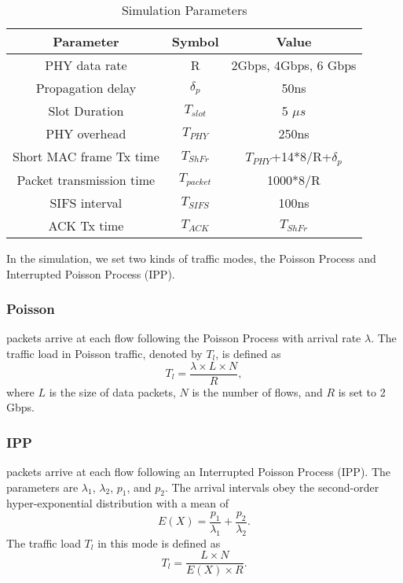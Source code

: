 \documentclass[journal]{IEEEtran}
\begin{document}
\begin{table}
\begin{center}
\caption{Simulation Parameters}
\def \temptablewidth {0.9\textwidth}
\begin{tabular}{ccc}
\hline
\textbf{Parameter}&\textbf{Symbol}&\textbf{Value}\\
\hline
PHY data rate & R & 2Gbps, 4Gbps, 6 Gbps \\
Propagation delay&${\delta _p}$& 50ns\\
Slot Duration & $T_{slot}$ & 5 $\mu s$\\
PHY overhead& ${T_{PHY}}$ & 250ns\\
Short MAC frame Tx time& ${T_{ShFr}}$& ${T_{PHY}}$+14*8/R+${\delta _p}$\\
Packet transmission time&${T_{packet}}$& 1000*8/R\\
SIFS interval&${T_{SIFS}}$& 100ns\\
ACK Tx time&${T_{ACK}}$&${T_{ShFr}}$\\
\hline
\end{tabular}
\label{tab:simulation_parameter}
\end{center}
\end{table}




In the simulation, we set two kinds of traffic modes, the Poisson Process and Interrupted Poisson
Process (IPP).

\subsubsection {\textbf{Poisson}} packets arrive at each flow following the Poisson Process with arrival
rate $\lambda $. The traffic load in Poisson traffic, denoted by ${T_l}$, is defined as
 \begin{equation}
{T_l} = \frac{{\lambda  \times L \times N}}{R}, \label{Tl_1}
\end{equation}
where $L$ is the size of data packets, $N$ is the number of flows, and $R$ is set to 2 Gbps.

\subsubsection {\textbf{IPP}} packets arrive at each flow following an Interrupted Poisson
Process (IPP). The parameters are ${{\lambda _1}}$, ${{\lambda _2}}$, ${{p_1}}$, and ${{p_2}}$. The
arrival intervals obey the second-order hyper-exponential distribution with a mean of
\begin{equation}
E(X) = \frac{{{p_1}}}{{{\lambda _1}}} + \frac{{{p_2}}}{{{\lambda _2}}}.
\end{equation}
The traffic load ${T_l}$ in this mode is defined as
 \begin{equation}
{T_l} = \frac{{L \times N}}{{E(X) \times R}}.\label{Tl_2}
\end{equation}
\end{document}
